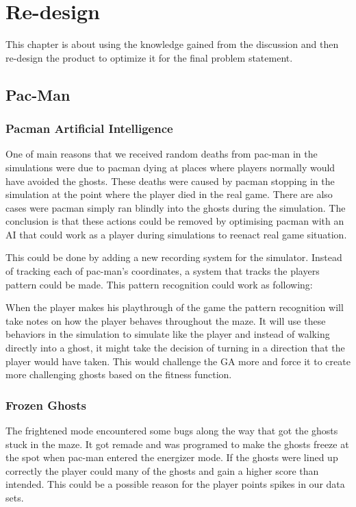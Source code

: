 \section{Re-design} \label{sec:redesign}

This chapter is about using the knowledge gained from the discussion and then re-design the product to optimize it for the final problem statement.

\subsection{Pac-Man}


\subsubsection{Pacman Artificial Intelligence}

One of main reasons that we received random deaths from pac-man in the simulations were due to pacman dying at places where players normally would have avoided the ghosts. These deaths were caused by pacman stopping in the simulation at the point where the player died in the real game. There are also cases were pacman simply ran blindly into the ghosts during the simulation. The conclusion is that these actions could be removed by optimising pacman with an AI that could work as a player during simulations to reenact real game situation.  

This could be done by adding a new recording system for the simulator. Instead of tracking each of pac-man's coordinates, a system that tracks the players pattern could be made. This pattern recognition could work as following:

When the player makes his playthrough of the game the pattern recognition will take notes on how the player behaves throughout the maze. It will use these behaviors in the simulation to simulate like the player and instead of walking directly into a ghost, it might take the decision of turning in a direction that the player would have taken. This would challenge the GA  more and force it to create more challenging ghosts based on the fitness function.


\subsubsection{Frozen Ghosts}

The frightened mode encountered some bugs along the way that got the ghosts stuck in the maze. It got remade and was programed to make the ghosts freeze at the spot when pac-man entered the energizer mode. If the ghosts were lined up correctly the player could many of the ghosts and gain a higher score than intended. This could be a possible reason for the player points spikes in our data sets.


